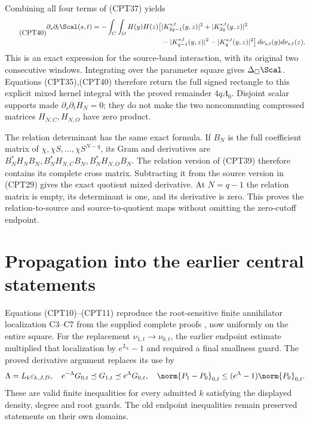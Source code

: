 Combining all four terms of (CPT37) yields
\begin{equation}\tag{CPT40}
\begin{split}
 \partial_s\partial_t\Scal(s,t)
 =-\int_C\int_O H(y)H(z)\big[
 &|K_{2q-1}^{s,t}(y,z)|^2+|K_{2q}^{s,t}(y,z)|^2\\
 &-|K_{q-1}^{s,t}(y,z)|^2-|K_q^{s,t}(y,z)|^2
 \big]\,d\nu_{s,t}(y)d\nu_{s,t}(z).
\end{split}
\end{equation}
This is an exact expression for the source-band interaction,
with its original two consecutive windows.  Integrating over
the parameter square gives \(\Delta_\square\Scal\).
Equations (CPT35),(CPT40) therefore return the full signed
rectangle to this explicit mixed kernel integral with the
proved remainder \(4q\Lambda_0\).
Disjoint scalar supports made \(\partial_s\partial_tH_N=0\);
they do not make the two noncommuting compressed matrices
\(H_{N,C},H_{N,O}\) have zero product.

The relation determinant has the same exact formula.
If \(B_N\) is the full coefficient matrix of
\(\chi,\chi S,\ldots,\chi S^{N-q}\), its Gram and derivatives
are \(B_N^*H_NB_N,B_N^*H_{N,C}B_N,B_N^*H_{N,O}B_N\).
The relation version of (CPT39) therefore contains its complete
cross matrix.  Subtracting it from the source version in
(CPT29) gives the exact quotient mixed derivative.  At
\(N=q-1\) the relation matrix is empty, its determinant is one,
and its derivative is zero.  This proves the relation-to-source
and source-to-quotient maps without omitting the zero-cutoff
endpoint.

\section{Propagation into the earlier central statements}

Equations (CPT10)--(CPT11) reproduce the root-sensitive finite
annihilator localization C3--C7 from the supplied complete
proofs \cite{cpt:complete}, now uniformly on the entire square.
For the replacement \(\nu_{1,t}\to\nu_{0,t}\), the earlier
endpoint estimate multiplied that localization by
\(e^{L_k}-1\) and required a final smallness guard.
The proved derivative argument replaces its use by
\[
 \Lambda=L_k\varepsilon_{k,J,D},\quad
 e^{-\Lambda}G_{0,t}\preceq G_{1,t}\preceq e^\Lambda G_{0,t},
 \quad
 \norm{P_1-P_0}_{0,t}\le(e^\Lambda-1)\norm{P_0}_{0,t}.
\]
These are valid finite inequalities for every admitted
\(k\) satisfying the displayed density, degree and root guards.
The old endpoint inequalities remain preserved statements
on their own domains.

